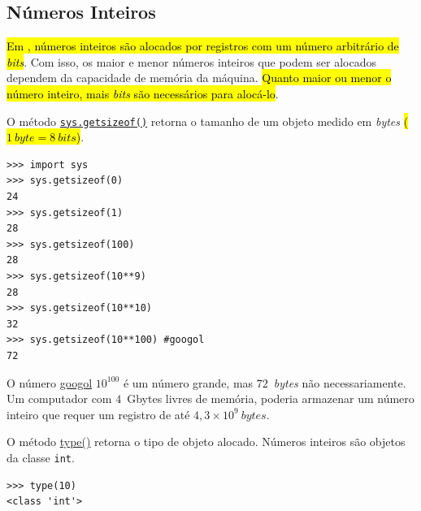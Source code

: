 \subsection{Números Inteiros}

\hl{Em {\python}, números inteiros são alocados por registros com um número arbitrário de \textit{bits}}. Com isso, os maior e menor números inteiros que podem ser alocados dependem da capacidade de memória da máquina. \hl{Quanto maior ou menor o número inteiro, mais \textit{bits} são necessários para alocá-lo}.

\begin{ex}
  O método {\python} \href{https://docs.python.org/3/library/sys.html\#sys.getsizeof}{\lstinline+sys.getsizeof()+} retorna o tamanho de um objeto medido em \textit{bytes} \hl{($1~\textit{byte} = 8~\textit{bits}$)}.

\begin{lstlisting}
>>> import sys
>>> sys.getsizeof(0)
24
>>> sys.getsizeof(1)
28
>>> sys.getsizeof(100)
28
>>> sys.getsizeof(10**9)
28
>>> sys.getsizeof(10**10)
32
>>> sys.getsizeof(10**100) #googol
72
\end{lstlisting}

  O número \href{https://en.wikipedia.org/wiki/Googol}{googol} $10^{100}$ é um número grande, mas $72$~\textit{bytes} não necessariamente. Um computador com $4$~Gbytes livres de memória, poderia armazenar um número inteiro que requer um registro de até $4,3\times 10^9~\textit{bytes}$.
\end{ex}

\begin{obs}
  O método {\python} \href{https://docs.python.org/3/library/functions.html\#type}{type()} retorna o tipo de objeto alocado. Números inteiros são objetos da classe \lstinline+int+.

\begin{lstlisting}
>>> type(10)
<class 'int'>
\end{lstlisting}

\end{obs}

